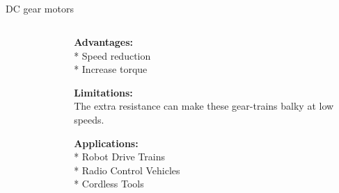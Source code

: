\subsection{}
{
\begin{frame}{DC gear motors}

\begin{columns}
\begin{column}{0.6\textwidth}  %

	\vspace{-3mm}
   	\begin{figure}
 	\end{figure}

\end{column}

\begin{column}{0.4\textwidth}

{\bf Advantages:} \\
* Speed reduction \\
* Increase torque

{\bf Limitations:} \\
The extra resistance can make these gear-trains balky at low speeds.

{\bf Applications:} \\
* Robot Drive Trains \\
* Radio Control Vehicles \\
* Cordless Tools



\end{column}
\end{columns}
\end{frame}
}




